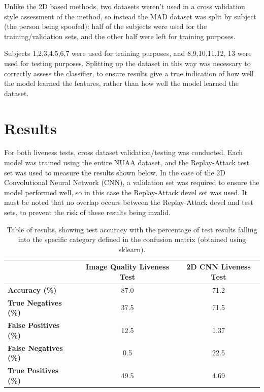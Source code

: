 \documentclass[11pt,a4paper]{article}
\begin{document}
            Unlike the 2D based methods, two datasets weren't used in a cross validation style assessment of the method, so instead the MAD dataset was split by subject (the person being spoofed):
            half of the subjects were used for the training/validation sets, and the other half were left for training purposes.

            Subjects 1,2,3,4,5,6,7 were used for training purposes, and 8,9,10,11,12, 13 were used for testing purposes. Splitting up the dataset in this way was necessary to correctly assess the classifier,
            to ensure results give a true indication of how well the model learned the features, rather than how well the model learned the dataset.

  
\section{Results}
    For both liveness tests, cross dataset validation/testing was conducted. Each model was trained using the entire NUAA dataset, and the Replay-Attack test set
    was used to measure the results shown below. In the case of the 2D Convolutional Neural Network (CNN), a validation set was required to ensure the model performed
    well, so in this case the Replay-Attack devel set was used. It must be noted that no overlap occurs between the Replay-Attack devel and test sets, to prevent the risk
    of these results being invalid.

    \begin{table}[ht]
        \centering
        \begin{tabular}[t]{lcc}
            \toprule
             & \textbf{Image Quality Liveness Test} & \textbf{2D CNN Liveness Test}\\
             \midrule
            \textbf{Accuracy (\%)} & 87.0 & 71.2\\
            \midrule
            \textbf{True Negatives (\%)} & 37.5 & 71.5\\
            \textbf{False Positives (\%)} & 12.5 & 1.37\\
            \textbf{False Negatives (\%)} & 0.5 & 22.5\\
            \textbf{True Positives (\%)} & 49.5 & 4.69\\
            \bottomrule
        \end{tabular}
        \caption{Table of results, showing test accuracy with the percentage of test results falling into the specific category defined in the confusion matrix (obtained using sklearn).}
        \label{ResultsTable}
    \end{table}
\end{document}

